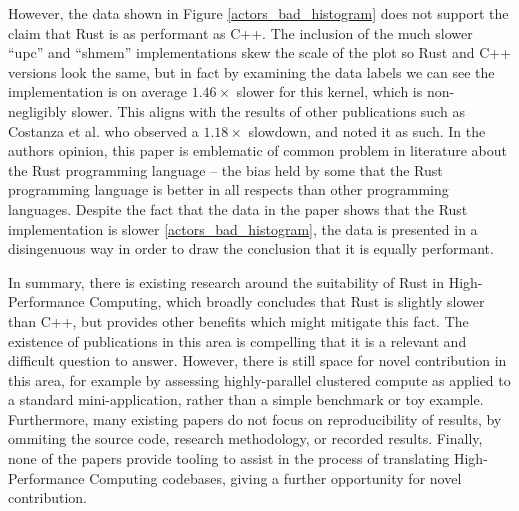 However, the data shown in Figure \ref{actors_bad_histogram} does not support the claim that Rust is as performant as C++. The inclusion of the much slower ``upc'' and ``shmem'' implementations skew the scale of the plot so Rust and C++ versions look the same, but in fact by examining the data labels we can see the implementation is on average $1.46\times$ slower for this kernel, which is non-negligibly slower. This aligns with the results of other publications such as Costanza et al. who observed a $1.18\times$ slowdown, and noted it as such. In the authors opinion, this paper is emblematic of common problem in literature about the Rust programming language -- the bias held by some that the Rust programming language is better in all respects than other programming languages. Despite the fact that the data in the paper shows that the Rust implementation is slower \ref{actors_bad_histogram}, the data is presented in a disingenuous way in order to draw the conclusion that it is equally performant.




In summary, there is existing research around the suitability of Rust in High-Performance Computing, which broadly concludes that Rust is slightly slower than C++, but provides other benefits which might mitigate this fact. The existence of publications in this area is compelling that it is a relevant and difficult question to answer. However, there is still space for novel contribution in this area, for example by assessing highly-parallel clustered compute as applied to a standard mini-application, rather than a simple benchmark or toy example. Furthermore, many existing papers do not focus on reproducibility of results, by ommiting the source code, research methodology, or recorded results. Finally, none of the papers provide tooling to assist in the process of translating High-Performance Computing codebases, giving a further opportunity for novel contribution.